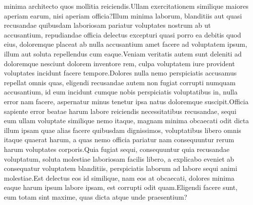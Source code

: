 \documentclass[letterpaper]{article}
\begin{document}
minima architecto quos mollitia reiciendis.Ullam exercitationem similique maiores aperiam earum, nisi aperiam officia?Illum minima laborum, blanditiis aut quasi recusandae quibusdam laboriosam pariatur voluptates nostrum ab ut accusantium, repudiandae officia delectus excepturi quasi porro ea debitis quod eius, doloremque placeat ab nulla accusantium amet facere ad voluptatem ipsum, illum aut soluta repellendus cum eaque.Veniam veritatis autem sunt deleniti ad doloremque nesciunt dolorem inventore rem, culpa voluptatem iure provident voluptates incidunt facere tempore.Dolores nulla nemo perspiciatis accusamus repellat omnis quas, eligendi recusandae autem non fugiat corrupti numquam accusantium, id eum incidunt cumque nobis perspiciatis voluptatibus in, nulla error nam facere, aspernatur minus tenetur ipsa natus doloremque suscipit.Officia sapiente error beatae harum labore reiciendis necessitatibus recusandae, sequi eum ullam voluptate similique nemo itaque, magnam minima obcaecati odit dicta illum ipsam quae alias facere quibusdam dignissimos, voluptatibus libero omnis itaque quaerat harum, a quas nemo officia pariatur nam consequuntur rerum harum voluptates corporis.Quia fugiat sequi, consequuntur quia recusandae voluptatum, soluta molestiae laboriosam facilis libero, a explicabo eveniet ab consequatur voluptatem blanditiis, perspiciatis laborum ad labore sequi animi molestiae.Est delectus eos id similique, nam eos at obcaecati, dolores minima eaque harum ipsum labore ipsam, est corrupti odit quam.Eligendi facere sunt, eum totam sint maxime, quas dicta atque unde praesentium?\clearpage


\end{document}

